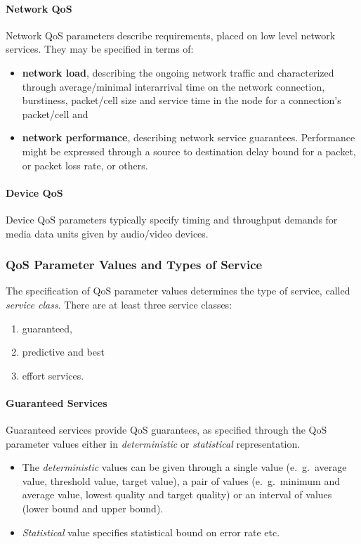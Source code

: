 \paragraph*{Network QoS}
Network QoS parameters describe requirements, placed on low level network services. They may be specified in terms of:
\begin{itemize}
	\item \textbf{network load}, describing the ongoing	network traffic and characterized through average/minimal interarrival time on the network connection, burstiness, packet/cell size and service time in the node for a connection's packet/cell and
	
	\item \textbf{network performance}, describing network service guarantees. Performance might be expressed through a source to destination delay bound for a packet, or packet loss rate, or others.
\end{itemize}

\paragraph*{Device QoS}
Device QoS parameters typically specify timing and throughput demands for media data units given by audio/video devices.

\subsubsection*{QoS Parameter Values and Types of Service}
The specification of QoS parameter values determines the type of service, called \textit{service class}. There are at least three service classes:
\begin{enumerate}
	\item guaranteed, 
	\item predictive and best
	\item effort services.
\end{enumerate}

\paragraph*{Guaranteed Services} 
Guaranteed services provide QoS guarantees, as specified through the QoS parameter values either in \textit{deterministic} or \textit{statistical} representation. 
\begin{itemize}
	\item The \textit{deterministic} values can be given through a single value (e.\ g.\ average value, threshold value, target value), a pair of values (e.\ g.\ minimum and average value, lowest quality and target quality) or an	interval of values (lower bound and upper bound). 
	\item \textit{Statistical} value specifies statistical bound on error rate etc. 
\end{itemize}

